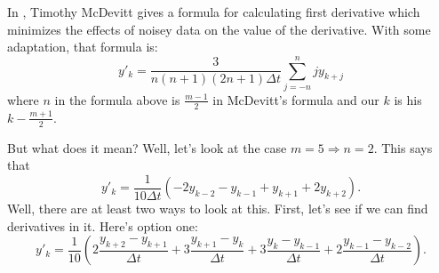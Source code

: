\documentclass{amsart}
\begin{document}
In \cite {McDevittSlides}, Timothy McDevitt gives a formula for calculating
first derivative which minimizes the effects of noisey data on the value of
the derivative.  With some adaptation, that formula is:
$$y'_k = \frac{3}{n(n+1)(2n+1) \Delta t} \sum_{j=-n}^n j y_{k+j}$$
where $n$ in the formula above is $\frac{m-1}{2}$ in McDevitt's formula and
our $k$ is his $k - \frac{m+1}{2}$.

But what does it mean?  Well, let's look at the case $m=5 \Rightarrow n = 2$.
This says that
$$y'_k = \frac{1}{10 \Delta t} \left( -2 y_{k-2} - y_{k-1} + y_{k+1} + 2
  y_{k+2} \right).$$
Well, there are at least two ways to look at this.  First, let's see if we can
find derivatives in it.  Here's option one:
$$y'_k = \frac{1}{10} \left( 2 \frac{y_{k+2} - y_{k+1}}{\Delta t} 
  + 3 \frac{y_{k+1} - y_k}{\Delta t} + 3 \frac{y_k - y_{k-1}}{\Delta t}
  + 2 \frac{y_{k-1} - y_{k-2}}{\Delta t} \right).$$
\end{document}
